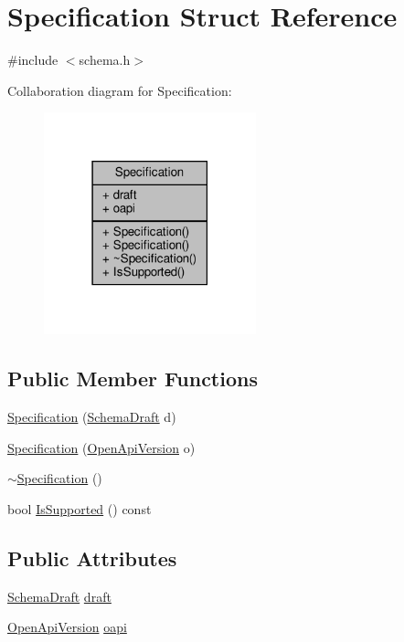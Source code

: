 \hypertarget{structSpecification}{}\section{Specification Struct Reference}
\label{structSpecification}


{\ttfamily \#include $<$schema.\+h$>$}



Collaboration diagram for Specification\+:
\nopagebreak
\begin{figure}[H]
\begin{center}
\leavevmode
\includegraphics[width=174pt]{structSpecification__coll__graph}
\end{center}
\end{figure}
\subsection*{Public Member Functions}
\begin{DoxyCompactItemize}
\item 
\hyperlink{structSpecification_acaf5571cd71de67ec6121875dd8190db}{Specification} (\hyperlink{schema_8h_a9804f9d7d7bd63131facb12bbeed41a9}{Schema\+Draft} d)
\item 
\hyperlink{structSpecification_a2d8d8a8689852cbb28d95d9d669e0381}{Specification} (\hyperlink{schema_8h_adb8b5aa4bb19e8e6920000a9ceebf0cd}{Open\+Api\+Version} o)
\item 
\hyperlink{structSpecification_a9e5dea83bffde839da128d4551a6a691}{$\sim$\+Specification} ()
\item 
bool \hyperlink{structSpecification_a49cac26e5a4562a75a8a85ae6298e870}{Is\+Supported} () const
\end{DoxyCompactItemize}
\subsection*{Public Attributes}
\begin{DoxyCompactItemize}
\item 
\hyperlink{schema_8h_a9804f9d7d7bd63131facb12bbeed41a9}{Schema\+Draft} \hyperlink{structSpecification_a3cc71ac1da84b59b19463d00c0ae0db3}{draft}
\item 
\hyperlink{schema_8h_adb8b5aa4bb19e8e6920000a9ceebf0cd}{Open\+Api\+Version} \hyperlink{structSpecification_a51e60efdc344044652e3c574c61b346e}{oapi}
\end{DoxyCompactItemize}


